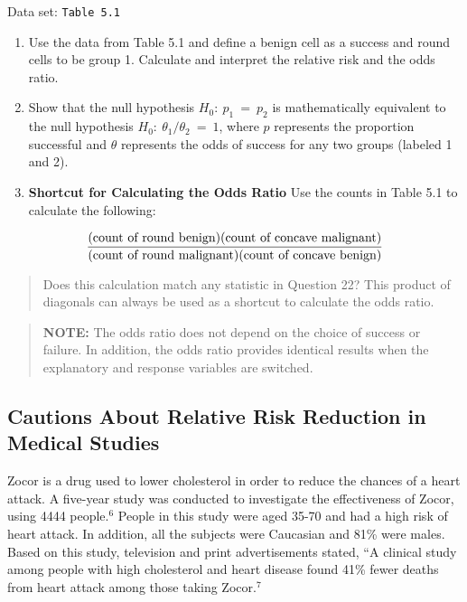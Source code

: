 \documentclass[
]{report}
\begin{document}
\vspace{-1em}

Data set: \texttt{Table\ 5.1}

\begin{enumerate}
\def\labelenumi{\arabic{enumi}.}
\setcounter{enumi}{21}
\item
  Use the data from Table 5.1 and define a benign cell as a success and round cells to be group 1. Calculate and interpret the relative risk and the odds ratio.
\item
  Show that the null hypothesis \(\scriptstyle H_0: \ p_1 \ =\  p_2\) is mathematically equivalent to the null hypothesis \(\scriptstyle H_0: \ \theta_1/\theta_2 \ =\  1\), where \(\scriptstyle p\) represents the proportion successful and \(\scriptstyle \theta\) represents the odds of success for any two groups (labeled 1 and 2).
\item
  \textbf{Shortcut for Calculating the Odds Ratio} Use the counts in Table 5.1 to calculate the following:
\end{enumerate}

\begin{align}
\frac{\text{(count of round benign)(count of concave malignant)}}{\text{(count of round malignant)(count of concave benign)}}
\notag
\end{align}

\begin{quote}
Does this calculation match any statistic in Question 22? This product of diagonals can always be used as a shortcut to calculate the odds ratio.
\end{quote}

\begin{quote}
\textbf{NOTE:} The odds ratio does not depend on the choice of success or failure. In addition, the odds ratio provides identical results when the explanatory and response variables are switched.
\end{quote}

\hypertarget{cautions-about-relative-risk-reduction-in-medical-studies}{%
\subsection*{Cautions About Relative Risk Reduction in Medical Studies}\label{cautions-about-relative-risk-reduction-in-medical-studies}}

Zocor is a drug used to lower cholesterol in order to reduce the chances of a heart attack. A five-year study was conducted to investigate the effectiveness of Zocor, using 4444 people.\(^6\) People in this study were aged 35-70 and had a high risk of heart attack. In addition, all the subjects were Caucasian and 81\% were males. Based on this study, television and print advertisements stated, ``A clinical study among people with high cholesterol and heart disease found 41\% fewer deaths from heart attack among those taking Zocor.\(^7\)
\end{document}
